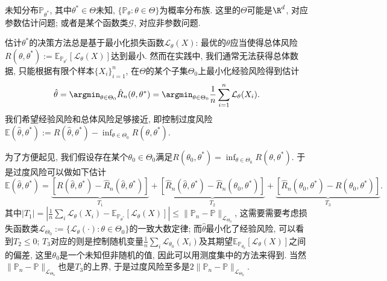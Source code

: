  
\begin{example}
未知分布$\mathbb{P}_{\theta^*}$, 其中$\theta^* \in \Theta$未知, $\{ \mathbb{P}_{\theta} \colon \theta \in \Theta\}$为概率分布族. 
这里的$\Theta$可能是$\R^d$, 对应参数估计问题; 或者是某个函数类$\mathscr{G}$, 对应非参数问题. 

估计$\theta^*$的决策方法总是基于最小化损失函数$\mathcal{L}_{\theta} (X)$: 最优的$\theta$应当使得总体风险$R(\theta, \theta^*) := \mathbb{E}_{\mathbb{P}_{\theta^*}}[\mathcal{L}_{\theta} (X)]$达到最小. 
然而在实践中, 我们通常无法获得总体数据, 只能根据有限个样本$\{ X_i \}_{i=1}^n$, 在$\Theta$的某个子集$\Theta_0$上最小化经验风险得到估计
\begin{equation*}
	\hat \theta 
	= \argmin_{\theta \in \Theta_0} \hat R_n (\theta, \theta^*) 
	= \argmin_{\theta \in \Theta_0} \frac{1}{n} \sum_{i=1}^n \mathcal{L}_{\theta} (X_i). 
\end{equation*}
我们希望经验风险和总体风险足够接近, 即控制过度风险$\mathbb{E}(\hat \theta, \theta^*) := R(\hat \theta, \theta^*) - \inf_{\theta \in \Theta_0} R(\theta, \theta^*)$. 

为了方便起见, 我们假设存在某个$\theta_0 \in \Theta_0$满足$R(\theta_0, \theta^*) = \inf_{\theta \in \Theta_0}R(\theta, \theta^*)$. 
于是过度风险可以做如下估计
\begin{equation*}
	\mathbb{E}(\hat \theta, \theta^*)
	= \underbrace{\left[ R(\hat \theta, \theta^*) - \hat R_n(\hat \theta, \theta^*) \right]}_{T_1}
	+ \underbrace{\left[ \hat R_n(\hat \theta, \theta^*) - \hat R_n(\theta_0, \theta^*) \right]}_{T_2}
	+ \underbrace{\left[ \hat R_n(\theta_0, \theta^*) - R(\theta_0, \theta^*) \right]}_{T_3}. 
\end{equation*}
其中$|T_1| = \left| \frac{1}{n} \sum_i \mathcal{L}_{\theta} (X_i) - \mathbb{E}_{\mathbb{P}_{\theta^*}}[\mathcal{L}_{\theta} (X)] \right| \leq \|\mathbb{P}_n - \mathbb{P}\|_{\mathcal{L}_{\Theta_0}}$, 这需要需要考虑损失函数类$\mathcal{L}_{\Theta_0} := \{ \mathcal{L}_{\theta}(\cdot) \colon \theta \in \Theta_0 \}$的一致大数定律; 
而$\hat \theta$最小化了经验风险, 可以看到$T_2 \leq 0$; 
$T_3$对应的则是控制随机变量$\frac{1}{n} \sum_i \mathcal{L}_{\theta_0}(X_i)$及其期望$\mathbb{E}_{\mathbb{P}_{\theta_0}}[\mathcal{L}_{\theta} (X)]$之间的偏差, 这里$\theta_0$是一个未知但非随机的值, 因此可以用测度集中的方法来得到. 
当然$\|\mathbb{P}_n - \mathbb{P}\|_{\mathcal{L}_{\Theta_0}}$也是$T_3$的上界, 于是过度风险至多是$2 \|\mathbb{P}_n - \mathbb{P}\|_{\mathcal{L}_{\Theta_0}}$. 
\end{example}

